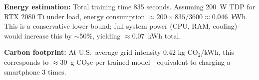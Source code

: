 \documentclass[9pt,twocolumn,twoside]{pnas-new}
\begin{document}
\textbf{Energy estimation:} Total training time 835 seconds. Assuming 200~W TDP for RTX 2080 Ti under load, energy consumption $\approx 200 \times 835 / 3600 \approx 0.046$~kWh. This is a conservative lower bound; full system power (CPU, RAM, cooling) would increase this by $\sim$50\%, yielding $\approx 0.07$~kWh total.

\textbf{Carbon footprint:} At U.S.\ average grid intensity 0.42 kg CO$_2$/kWh, this corresponds to $\approx 30$~g CO$_2$e per trained model---equivalent to charging a smartphone 3 times.


\end{document}
